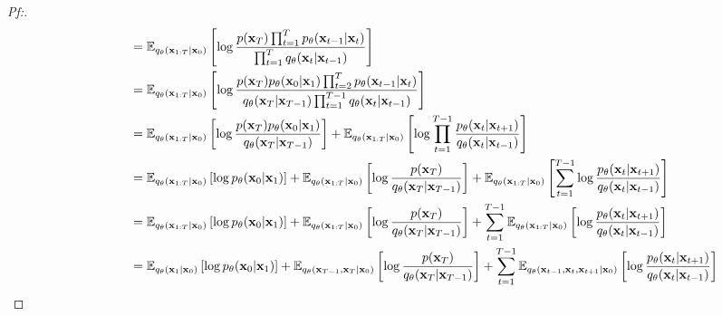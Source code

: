 \documentclass{article}
\begin{document}
\begin{proof}[\textit{Pf:}]
\begin{align}
        &\qquad\qquad\,\, = \mathbb{E}_{q_{\theta}(\mathbf{x}_{1:T}|\mathbf{x}_0)}\left[\log \frac{p(\mathbf{x}_T) \prod_{t=1}^{T}p_{\theta}(\mathbf{x}_{t-1}|\mathbf{x}_t)}{\prod_{t=1}^{T} q_{\theta}(\mathbf{x}_{t}|\mathbf{x}_{t-1})} \right] \notag \\
        &\qquad\qquad\,\, = \mathbb{E}_{q_{\theta}(\mathbf{x}_{1:T}|\mathbf{x}_0)}\left[\log \frac{p(\mathbf{x}_T)p_{\theta}(\mathbf{x}_0|\mathbf{x}_1) \prod_{t=2}^{T}p_{\theta}(\mathbf{x}_{t-1}|\mathbf{x}_t)}{q_{\theta}(\mathbf{x}_{T}|\mathbf{x}_{T-1})\prod_{t=1}^{T-1} q_{\theta}(\mathbf{x}_t|\mathbf{x}_{t-1})} \right] \notag \\
        &\qquad\qquad\,\, = \mathbb{E}_{q_{\theta}(\mathbf{x}_{1:T}|\mathbf{x}_0)}\left[\log \frac{p(\mathbf{x}_T)p_{\theta}(\mathbf{x}_0|\mathbf{x}_1)}{q_{\theta}(\mathbf{x}_{T}|\mathbf{x}_{T-1})} \right] + \mathbb{E}_{q_{\theta}(\mathbf{x}_{1:T}|\mathbf{x}_0)}\left[\log \prod_{t=1}^{T-1} \frac{p_{\theta}(\mathbf{x}_{t}|\mathbf{x}_{t+1})}{q_{\theta}(\mathbf{x}_t|\mathbf{x}_{t-1})} \right] \notag \\
        &\qquad\qquad\,\, = \mathbb{E}_{q_{\theta}(\mathbf{x}_{1:T}|\mathbf{x}_0)} \left[ \log p_{\theta}(\mathbf{x}_0|\mathbf{x}_1) \right] + 
        \mathbb{E}_{q_{\theta}(\mathbf{x}_{1:T}|\mathbf{x}_0)}\left[\log \frac{p(\mathbf{x}_T)}{q_{\theta}(\mathbf{x}_{T}|\mathbf{x}_{T-1})} \right]
         + \mathbb{E}_{q_{\theta}(\mathbf{x}_{1:T}|\mathbf{x}_0)} \left[\sum_{t=1}^{T-1}  \log \frac{p_{\theta}(\mathbf{x}_{t}|\mathbf{x}_{t+1})}{q_{\theta}(\mathbf{x}_t|\mathbf{x}_{t-1})} \right] \notag \\
        &\qquad\qquad\,\, = \mathbb{E}_{q_{\theta}(\mathbf{x}_{1:T}|\mathbf{x}_0)} \left[ \log p_{\theta}(\mathbf{x}_0|\mathbf{x}_1) \right] + 
        \mathbb{E}_{q_{\theta}(\mathbf{x}_{1:T}|\mathbf{x}_0)}\left[\log \frac{p(\mathbf{x}_T)}{q_{\theta}(\mathbf{x}_{T}|\mathbf{x}_{T-1})} \right]
         + \sum_{t=1}^{T-1} \mathbb{E}_{q_{\theta}(\mathbf{x}_{1:T}|\mathbf{x}_0)} \left[\log \frac{p_{\theta}(\mathbf{x}_{t}|\mathbf{x}_{t+1})}{q_{\theta}(\mathbf{x}_t|\mathbf{x}_{t-1})} \right] \notag \\
        &\qquad\qquad\,\, = \mathbb{E}_{q_{\theta}(\mathbf{x}_1|\mathbf{x}_0)} \left[ \log p_{\theta}(\mathbf{x}_0|\mathbf{x}_1) \right] + 
        \mathbb{E}_{q_{\theta}(\mathbf{x}_{T-1}, \mathbf{x}_{T} |\mathbf{x}_0)}\left[\log \frac{p(\mathbf{x}_T)}{q_{\theta}(\mathbf{x}_{T}|\mathbf{x}_{T-1})} \right]
         + \sum_{t=1}^{T-1} \mathbb{E}_{q_{\theta}(\mathbf{x}_{t-1}, \mathbf{x}_{t}, \mathbf{x}_{t+1}|\mathbf{x}_0)} \left[\log \frac{p_{\theta}(\mathbf{x}_{t}|\mathbf{x}_{t+1})}{q_{\theta}(\mathbf{x}_t|\mathbf{x}_{t-1})} \right] \notag \\

\end{align}
\end{proof}
\end{document}
